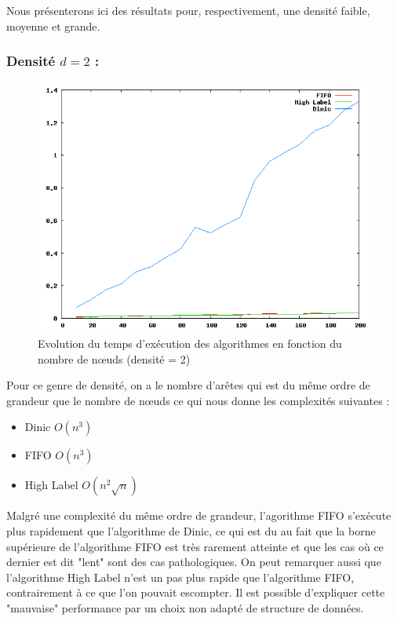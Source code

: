 Nous présenterons ici des résultats pour, respectivement, une densité faible, moyenne et grande.\\

\subsubsection{Densité $d = 2$ :}

\begin{figure}
\begin{center}
\includegraphics[scale=0.6]{../data_struct/results/ratio2.png}
\end{center}
\caption{Evolution du temps d'exécution des algorithmes en fonction du nombre de n\oe uds (densité =
2)}
\label{d2}
\end{figure}

Pour ce genre de densité, on a le nombre d'arêtes qui est du même ordre de grandeur que le nombre de
n\oe uds ce qui nous donne les complexités suivantes :
\begin{itemize}
\item Dinic $O(n^3)$
\item FIFO $O(n^3)$
\item High Label $O(n^2\sqrt{n})$
\end{itemize}

Malgré une complexité du même ordre de grandeur, l'agorithme FIFO s'exécute plus rapidement que
l'algorithme de Dinic, ce qui est du au fait que la borne supérieure de l'algorithme FIFO est très
rarement atteinte et que les cas où ce dernier est dit "lent" sont des cas pathologiques. On peut
remarquer aussi que l'algorithme High Label n'est un pas plus rapide que l'algorithme FIFO,
contrairement à ce que l'on pouvait escompter. Il est possible d'expliquer cette "mauvaise"
performance par un choix non adapté de structure de données.

